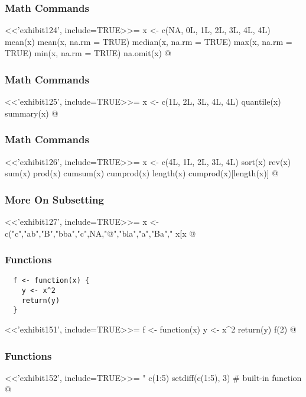 \begin{frame}[fragile]%
\frametitle{Math Commands}
<<'exhibit124', include=TRUE>>=
  x <- c(NA, 0L, 1L, 2L, 3L, 4L, 4L)
  mean(x)
  mean(x, na.rm = TRUE)
  median(x, na.rm = TRUE)
  max(x, na.rm = TRUE)
  min(x, na.rm = TRUE)
  na.omit(x)
@
\end{frame}


\begin{frame}[fragile]%
\frametitle{Math Commands}
<<'exhibit125', include=TRUE>>=
  x <- c(1L, 2L, 3L, 4L, 4L)
  quantile(x)
  summary(x)
@
\end{frame}


\begin{frame}[fragile]%
\frametitle{Math Commands}
<<'exhibit126', include=TRUE>>=
  x <- c(4L, 1L, 2L, 3L, 4L)
  sort(x)
  rev(x)
  sum(x)
  prod(x)
  cumsum(x)
  cumprod(x)
  length(x)
  cumprod(x)[length(x)]
@
\end{frame}


\begin{frame}[fragile]%
\frametitle{More On Subsetting}
<<'exhibit127', include=TRUE>>=
  x <- c("c","ab","B","bba","c",NA,"@","bla","a","Ba","%
  x[x %
@
\end{frame}


\begin{frame}[fragile]
\frametitle{Functions}
\begin{lstlisting}
  f <- function(x) {
    y <- x^2
    return(y)
  }
\end{lstlisting}
<<'exhibit151', include=TRUE>>=
  f <- function(x) {
    y <- x^2
    return(y)
  }
  f(2)
@
\end{frame}


\begin{frame}[fragile]
\frametitle{Functions}
<<'exhibit152', include=TRUE>>=
  "%
  c(1:5) %
  setdiff(c(1:5), 3)  # built-in function
@
\end{frame}
